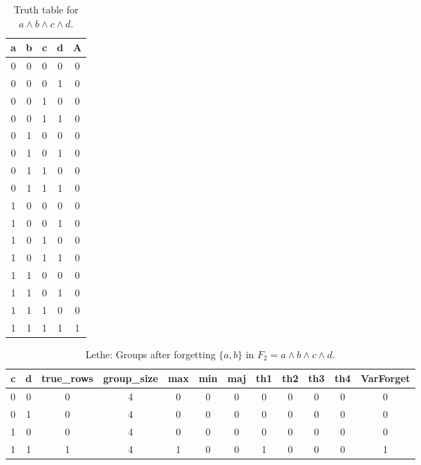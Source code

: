 \begin{table}[!tb]
    \centering
    \begin{tabular}{|c|c|c|c|c|}
        \hline
        \textbf{a} & \textbf{b} & \textbf{c} & \textbf{d} & \textbf{A} \\ \hline
        0 & 0 & 0 & 0 & 0 \\ \hline
        0 & 0 & 0 & 1 & 0 \\ \hline
        0 & 0 & 1 & 0 & 0 \\ \hline
        0 & 0 & 1 & 1 & 0 \\ \hline
        0 & 1 & 0 & 0 & 0 \\ \hline
        0 & 1 & 0 & 1 & 0 \\ \hline
        0 & 1 & 1 & 0 & 0 \\ \hline
        0 & 1 & 1 & 1 & 0 \\ \hline
        1 & 0 & 0 & 0 & 0 \\ \hline
        1 & 0 & 0 & 1 & 0 \\ \hline
        1 & 0 & 1 & 0 & 0 \\ \hline
        1 & 0 & 1 & 1 & 0 \\ \hline
        1 & 1 & 0 & 0 & 0 \\ \hline
        1 & 1 & 0 & 1 & 0 \\ \hline
        1 & 1 & 1 & 0 & 0 \\ \hline
        1 & 1 & 1 & 1 & 1 \\ \hline
    \end{tabular}
    \caption{Truth table for $a \land b \land c \land d$.}
    \label{tab:truthtab}
\end{table}

\begin{table}[!tb]
    \centering
    \begin{tabular}{|c|c|c|c|c|c|c|c|c|c|c|c|}
        \hline
        \textbf{c} & \textbf{d} & \textbf{true\_rows} & \textbf{group\_size} & \textbf{max} & \textbf{min} & \textbf{maj} & \textbf{th1} & \textbf{th2} & \textbf{th3} & \textbf{th4} & \textbf{VarForget} \\ \hline
        \rowcolor{gray!40} 0 & 0 & 0 & 4 & 0 & 0 & 0 & 0 & 0 & 0 & 0 & 0 \\ \hline
        \rowcolor{blue!40} 0 & 1 & 0 & 4 & 0 & 0 & 0 & 0 & 0 & 0 & 0 & 0 \\ \hline
        \rowcolor{red!40} 1 & 0 & 0 & 4 & 0 & 0 & 0 & 0 & 0 & 0 & 0 & 0 \\ \hline
        \rowcolor{green!40} 1 & 1 & 1 & 4 & 1 & 0 & 0 & 1 & 0 & 0 & 0 & 1 \\ \hline
    \end{tabular}
    \caption{Lethe: Groups after forgetting $\{a, b\}$ in $F_{2} = a \land b \land c \land d$.}
    \label{tab:lethe-F2-ab-groups}
\end{table}
